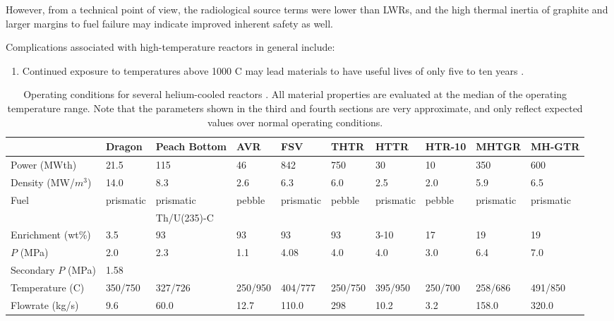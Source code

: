 \documentclass[10pt]{article}
\numberwithin{equation}{section} %
\begin{document}
However, from a technical point of view, the radiological source terms were lower than LWRs, and the high thermal inertia of graphite and larger margins to fuel failure may indicate improved inherent safety as well. 

Complications associated with high-temperature reactors in general include:

\begin{enumerate}
\item Continued exposure to temperatures above 1000 \degree C may lead materials to have useful lives of only five to ten years \cite{PNNLReport}.
\end{enumerate}

\clearpage
\begin{table}
\begin{table}[H]
\caption{Operating conditions for several helium-cooled reactors \cite{HTGRLessonsLearned}. All material properties are evaluated at the median of the operating temperature range. Note that the parameters shown in the third and fourth sections are very approximate, and only reflect expected values over normal operating conditions.}
\centering
\begin{tabular}{l l l l l l l l l l}
\hline\hline
 								& Dragon 		& Peach Bottom & AVR 		& FSV		& THTR 		& HTTR 		& HTR-10 	& MHTGR 	& MH-GTR\\ [0.5ex]
\hline
 Power (MWth)						& 21.5		& 115		& 46			& 842 		& 750		& 30			& 10			& 350		& 600\\
 Density (MW/\(m^3\))				& 14.0		& 8.3			& 2.6			& 6.3			& 6.0			& 2.5			& 2.0			& 5.9			& 6.5\\
 \hdashline
 Fuel	 							& prismatic	& prismatic	& pebble		& prismatic	& pebble		& prismatic	& pebble		& prismatic	& prismatic\\
 								& 			& Th/U(235)-C\\
 Enrichment (wt\%)					& 3.5			& 93			& 93			& 93			& 93			& 3-10		& 17			& 19			& 19\\
 \hdashline
 \(P\) (MPa)						& 2.0			& 2.3			& 1.1			& 4.08		& 4.0			& 4.0			& 3.0			& 6.4			& 7.0\\
 Secondary \(P\) (MPa)				& 1.58		&			&			&			&			&			&\\
 Temperature (C)					& 350/750		& 327/726		& 250/950		& 404/777		& 250/750		& 395/950		& 250/700		& 258/686		& 491/850\\
 Flowrate (kg/s)						& 9.6			& 60.0		& 12.7		& 110.0		& 298		& 10.2		& 3.2			& 158.0		& 320.0\\

\end{tabular}
\end{table}
\end{table}
\end{document}
